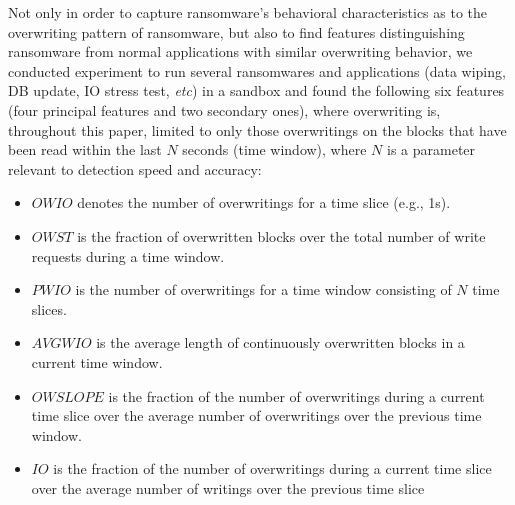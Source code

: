 \documentclass[conference]{IEEEtran}
\newcommand{\eg}{e.g.,\xspace}
\newcommand{\etc}{{\em etc}\xspace}
\begin{document}
Not only in order to capture ransomware's behavioral characteristics
as to the overwriting pattern of ransomware,
but also to find features distinguishing ransomware from normal applications with similar overwriting behavior,
we conducted experiment to run several ransomwares and applications 
(data wiping, DB update, IO stress test, \etc) in a sandbox and found
the following six features (four principal features and two secondary ones), 
where overwriting is, throughout this paper, 
limited to only those overwritings on the blocks 
that have been read within the last $N$ seconds (time window), 
where $N$ is a parameter relevant to detection speed and accuracy:

\begin{itemize}
\item $OWIO$ denotes the number of overwritings for a time slice (\eg 1s). 
\item $OWST$ is the fraction of overwritten blocks over the total number of write requests during a time window.
\item $PWIO$ is the number of overwritings for a time window consisting of $N$ time slices.
\item $AVGWIO$ is the average length of continuously overwritten blocks in a current time window.
\item $OWSLOPE$ is the fraction of the number of overwritings during a current time slice
over the average number of overwritings over the previous time window.
\item $IO$ is the fraction of the number of overwritings during a current time slice 
over the average number of writings over the previous time slice
\end{itemize}
\end{document}

